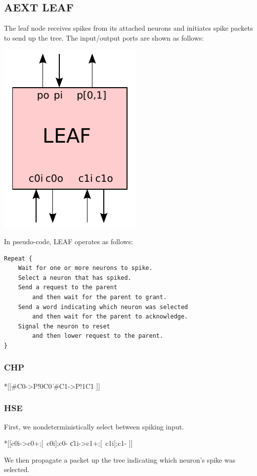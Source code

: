 \documentclass{article}
\begin{document}
\subsection{AEXT LEAF \label{sec:AEXT_LEAF}}

The leaf node receives spikes from its attached neurons and initiates spike
packets to send up the tree. The input/output ports are shown as follows:

\begin{center}
  \includegraphics[width=.16\textwidth]{img/aext_leaf.pdf}
\end{center}

\noindent
In pseudo-code, LEAF operates as follows:

\begin{lstlisting}
Repeat {
    Wait for one or more neurons to spike.
    Select a neuron that has spiked.
    Send a request to the parent
        and then wait for the parent to grant.
    Send a word indicating which neuron was selected
        and then wait for the parent to acknowledge.
    Signal the neuron to reset
        and then lower request to the parent.
}
\end{lstlisting}

\subsubsection*{CHP}

\begin{csp}
*[[#{C0}->P!0\*C0
  \|#{C1}->P!1\*C1
 ]]
\end{csp}

\subsubsection*{HSE}

First, we nondeterministically select between spiking input.

\begin{hse}
*[[c0i->c0+;[~c0i];c0-
  \|c1i->c1+;[~c1i];c1-
 ]]
\end{hse}

\noindent
We then propagate a packet up the tree indicating which neuron's spike was selected.
\end{document}
